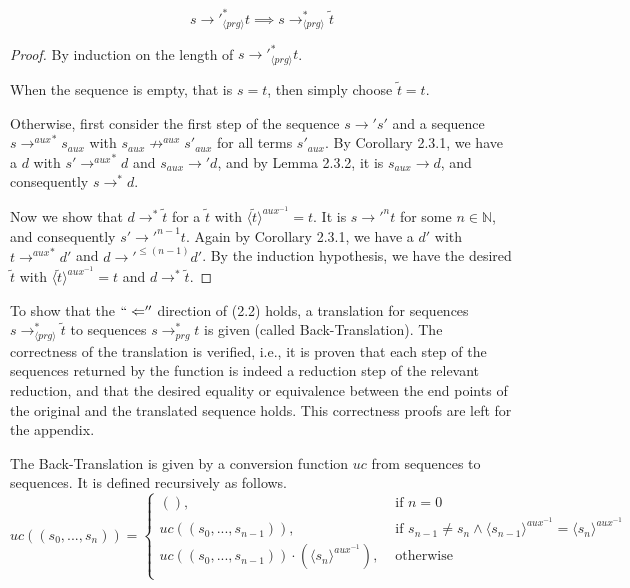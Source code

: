 \begin{lemma}
\[
s {\longrightarrow'}_{\langle prg \rangle}^* t \implies s \longrightarrow^*_{\langle prg \rangle} \widetilde{t}
\]

\begin{proof}

By induction on the length of $s {\longrightarrow'}_{\langle prg \rangle}^* t$.

When the sequence is empty, that is $s = t$, then simply choose $\widetilde{t} = t$.

Otherwise, first consider the first step of the sequence $s \longrightarrow' s'$ and a sequence $s {\longrightarrow^{aux}}^* s_{aux}$ with $s_{aux} \not\longrightarrow^{aux} s'_{aux}$ for all terms $s'_{aux}$.  By Corollary 2.3.1, we have a $d$ with $s' {\longrightarrow^{aux}}^* d$ and $s_{aux} \longrightarrow' d$, and by Lemma 2.3.2, it is $s_{aux} \longrightarrow d$, and consequently $s \longrightarrow^* d$.

Now we show that $d \longrightarrow^* \widetilde{t}$ for a $\widetilde{t}$ with $\langle \widetilde{t} \rangle^{aux^{-1}} = t$. It is $s {\longrightarrow'}^n t$ for some $n \in \mathbb{N}$, and consequently $s' {\longrightarrow'}^{n-1} t$. Again by Corollary 2.3.1, we have a $d'$ with $t {\longrightarrow^{aux}}^* d'$ and $d {\longrightarrow'}^{\leq(n-1)} d'$. By the induction hypothesis, we have the desired $\widetilde{t}$ with $\langle \widetilde{t} \rangle^{aux^{-1}} = t$ and $d \longrightarrow^* \widetilde{t}$.

\end{proof}

\end{lemma}

To show that the $`` \Leftarrow ''$ direction of (2.2) holds, a translation for sequences $s \longrightarrow^*_{\langle prg \rangle} \widetilde{t}$ to sequences $s \longrightarrow^*_{prg} t$ is given (called Back-Translation). The correctness of the translation is verified, i.e., it is proven that each step of the sequences returned by the function is indeed a reduction step of the relevant reduction, and that the desired equality or equivalence between the end points of the original and the translated sequence holds. This correctness proofs are left for the appendix.

\begin{definition}
The Back-Translation is given by a conversion function $uc$ from sequences to sequences. It is defined recursively as follows.
\[
  uc((s_0, ..., s_n))=\begin{cases}
               (), &\text{ if } n = 0 \\
               uc((s_0, ..., s_{n-1})), &\text{ if } s_{n-1} \neq s_n \land \langle s_{n-1} \rangle^{aux^{-1}} = \langle s_n \rangle^{aux^{-1}} \\
               uc((s_0, ..., s_{n-1})) \cdot (\langle s_n \rangle^{aux^{-1}}), &\text{ otherwise} \\
            \end{cases}
\]

\end{definition}

